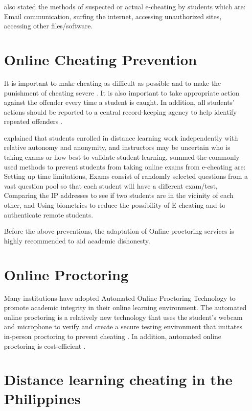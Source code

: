  also stated the methods of suspected or actual e-cheating by students which are: Email communication, surfing the internet, accessing unauthorized sites, accessing other files/software.

\section*{Online Cheating Prevention}

It is important to make cheating as difficult as possible and to make the punishment of cheating severe \cite{genereux1995circumstances}.
It is also important to take appropriate action against the offender every time a student is caught.
In addition, all students' actions should be reported to a central record-keeping agency to help identify repeated offenders \cite{todd1987cheating}.

 explained that students enrolled in distance learning work independently with relative autonomy and anonymity, and instructors may be uncertain who is taking exams or how best to validate student learning.
 summed the commonly used methods to prevent students from taking online exams from e-cheating are: Setting up time limitations, Exams consist of randomly selected questions from a vast question pool so that each student will have a different exam/test, Comparing the IP addresses to see if two students are in the vicinity of each other, and Using biometrics to reduce the possibility of E-cheating and to authenticate remote students.

Before the above preventions, the adaptation of Online proctoring services is highly recommended to aid academic dishonesty.

\section*{Online Proctoring}

Many institutions have adopted Automated Online Proctoring Technology to promote academic integrity in their online learning environment.
The automated online proctoring is a relatively new technology that uses the student's webcam and microphone to verify and create a secure testing environment that imitates in-person proctoring to prevent cheating \cite{karim2014cheating}.
In addition, automated online proctoring is cost-efficient \cite{atoum2017automated}.

\section*{Distance learning cheating in the Philippines}

